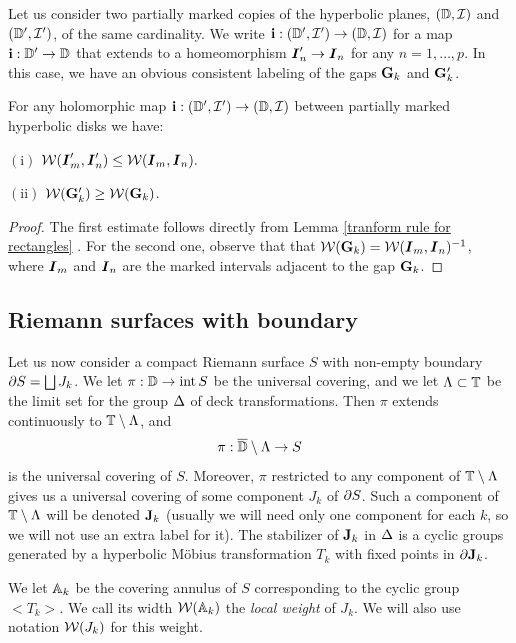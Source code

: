 Let us consider two partially marked copies of the hyperbolic planes, $({\Bbb D}, {\mathcal I})$ 
and $ ({\Bbb D}', {\mathcal I}')$, of the same cardinality. We write 
${\mathbf{i}} : ({\Bbb D}',{\mathcal I}')  \rightarrow ({\Bbb D}, {\mathcal I}) $ for a map ${\mathbf{i}}: {\Bbb D}' \rightarrow {\Bbb D}$
that  extends to a  homeomorphism   ${\boldsymbol{I}}_n' \rightarrow {\boldsymbol{I}}_n$ for any  $n=1,\dots, p$.   
In this case, we have an obvious consistent labeling  of the gaps
${\mathbf{G}}_k$ and ${\mathbf{G}}_k'$. 

\begin{lem}\label{transform rules on D}
  For any holomorphic map ${\mathbf{i}}: ({\Bbb D}', {\mathcal I}') \rightarrow ({\Bbb D}, {\mathcal I}) $ between
  partially marked hyperbolic disks we have:

\ssk\nin $\mathrm { (i) } $
$
   {\mathcal W}({\boldsymbol{I}}_m' , {\boldsymbol{I}}_n')  \leq {\mathcal W}({\boldsymbol{I}}_m, {\boldsymbol{I}}_n). 
$

\ssk\nin $ \mathrm {(ii)} $  ${\mathcal W}({\mathbf{G}}_k' ) \geq {\mathcal W}({\mathbf{G}}_k)$. 
\end{lem}

\begin{proof}
  The first estimate follows directly from 
Lemma \ref{tranform rule for rectangles} .  For the second one, observe that
that ${\mathcal W} ({\mathbf{G}}_k)= {\mathcal W} ({\boldsymbol{I}}_m, {\boldsymbol{I}}_n )^{-1}$, where ${\boldsymbol{I}}_m$ and
${\boldsymbol{I}}_n$ are the marked intervals adjacent to the gap ${\mathbf{G}}_k$.  
\end{proof}

\subsection{Riemann surfaces with boundary}


Let us now consider a compact Riemann surface $S$ with non-empty
boundary $\partial S = \bigsqcup J_k$. We let $\pi: {\Bbb D} \rightarrow \operatorname{int} S$ be the 
universal covering, 
and we let ${\Lambda}\subset {\Bbb T}$ be the limit set for the  group ${\Delta}$
of deck transformations.  Then $\pi$ extends continuously to ${\Bbb T}\setminus
{\Lambda}$, and
$$
    \pi:  \overline {{\Bbb D}} \setminus {\Lambda} \rightarrow  S 
$$ 
is the  universal covering of $S$. Moreover, $\pi$ restricted to  any component of
${\Bbb T}\setminus {\Lambda}$  gives us a universal covering of some component $J_k$ of
$\partial S$.  Such a component of ${\Bbb T}\setminus {\Lambda}$ will be denoted ${\mathbf{J}}_k$
(usually we will need only one component for each $k$, 
so we will not use an extra label for it). 
The stabilizer of ${\mathbf{J}}_k$ in ${\Delta}$ is a cyclic groups generated by
a hyperbolic M\"obius transformation $T_k$ with fixed points in  $\partial {\mathbf{J}}_k$.



We let ${\Bbb A}_k$ be the covering annulus of $S$ corresponding to the
cyclic group $<T_k>$. We call its width ${\mathcal W}({\Bbb A}_k)$ 
the {\it local  weight} of $J_k$. We will also use notation ${\mathcal W}(J_k)$
for this weight.  

